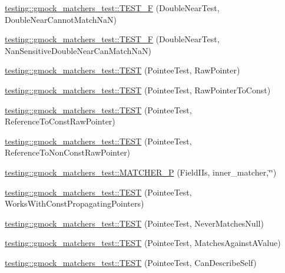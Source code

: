 \begin{DoxyCompactItemize}
\hyperlink{namespacetesting_1_1gmock__matchers__test_a9542b930e1de4d087a8655855edcc13c}{testing\+::gmock\+\_\+matchers\+\_\+test\+::\+T\+E\+S\+T\+\_\+F} (Double\+Near\+Test, Double\+Near\+Cannot\+Match\+NaN)
\item 
\hyperlink{namespacetesting_1_1gmock__matchers__test_a7c8d850697cb6cc030a4b05eeecffb72}{testing\+::gmock\+\_\+matchers\+\_\+test\+::\+T\+E\+S\+T\+\_\+F} (Double\+Near\+Test, Nan\+Sensitive\+Double\+Near\+Can\+Match\+NaN)
\item 
\hyperlink{namespacetesting_1_1gmock__matchers__test_ad6a13303d164fa9ca035a137840b78cb}{testing\+::gmock\+\_\+matchers\+\_\+test\+::\+T\+E\+ST} (Pointee\+Test, Raw\+Pointer)
\item 
\hyperlink{namespacetesting_1_1gmock__matchers__test_a84a21ee7de697401049cb932f859ee33}{testing\+::gmock\+\_\+matchers\+\_\+test\+::\+T\+E\+ST} (Pointee\+Test, Raw\+Pointer\+To\+Const)
\item 
\hyperlink{namespacetesting_1_1gmock__matchers__test_aebba40e49fe790490ba88984fdc7c7a6}{testing\+::gmock\+\_\+matchers\+\_\+test\+::\+T\+E\+ST} (Pointee\+Test, Reference\+To\+Const\+Raw\+Pointer)
\item 
\hyperlink{namespacetesting_1_1gmock__matchers__test_a2d2296f6b23130be225b8df48746dfd5}{testing\+::gmock\+\_\+matchers\+\_\+test\+::\+T\+E\+ST} (Pointee\+Test, Reference\+To\+Non\+Const\+Raw\+Pointer)
\item 
\hyperlink{namespacetesting_1_1gmock__matchers__test_a43d7cb618a83048cd99b55edbec586bb}{testing\+::gmock\+\_\+matchers\+\_\+test\+::\+M\+A\+T\+C\+H\+E\+R\+\_\+P} (Field\+I\+Is, inner\+\_\+matcher,\char`\"{}\char`\"{})
\item 
\hyperlink{namespacetesting_1_1gmock__matchers__test_a9d851a5bb597fa45b5d1cf3f295398e8}{testing\+::gmock\+\_\+matchers\+\_\+test\+::\+T\+E\+ST} (Pointee\+Test, Works\+With\+Const\+Propagating\+Pointers)
\item 
\hyperlink{namespacetesting_1_1gmock__matchers__test_ac778a9cebf9306a5efd27cc1186d8269}{testing\+::gmock\+\_\+matchers\+\_\+test\+::\+T\+E\+ST} (Pointee\+Test, Never\+Matches\+Null)
\item 
\hyperlink{namespacetesting_1_1gmock__matchers__test_afe22e8230dc7a34498e4b2f91dcdd7cd}{testing\+::gmock\+\_\+matchers\+\_\+test\+::\+T\+E\+ST} (Pointee\+Test, Matches\+Against\+A\+Value)
\item 
\hyperlink{namespacetesting_1_1gmock__matchers__test_ac8b9baa938635d587f0b0df1073208e2}{testing\+::gmock\+\_\+matchers\+\_\+test\+::\+T\+E\+ST} (Pointee\+Test, Can\+Describe\+Self)

\end{DoxyCompactItemize}

